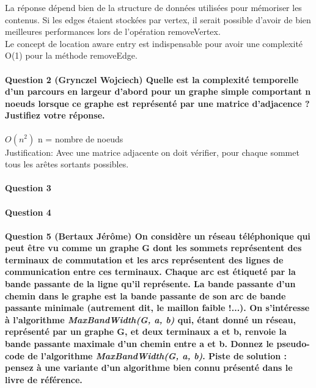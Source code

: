 \documentclass[a4paper]{article}
\begin{document}
La réponse dépend bien de la structure de données utilisées pour mémoriser les contenus. Si les edges étaient stockées par vertex, il serait possible d'avoir de bien meilleures performances lors de l'opération removeVertex.\\

Le concept de location aware entry est indispensable pour avoir une complexité O(1) pour la méthode removeEdge.

\paragraph{Question 2 (Grynczel Wojciech) Quelle est la complexité temporelle d’un parcours en largeur d’abord pour un	graphe simple comportant n noeuds lorsque ce graphe est représenté par une matrice d’adjacence ? Justifiez votre réponse.\\}

$ O(n^2) $ 	n = nombre de noeuds\\
Justification: Avec une matrice adjacente on doit vérifier, pour chaque sommet  tous les arêtes sortants possibles.


\paragraph{Question 3}

\paragraph{Question 4}

\paragraph{Question 5 (Bertaux Jérôme) On considère un réseau téléphonique qui peut être vu comme un graphe G dont les sommets représentent des terminaux de commutation et les arcs représentent des lignes de communication entre ces terminaux. Chaque arc est étiqueté par la bande passante de la ligne qu’il représente. La bande passante d’un chemin dans le graphe est la bande passante de son arc de bande passante minimale (autrement dit, le maillon faible !...). On s'intéresse à l’algorithme \textit{MaxBandWidth(G, a, b)} qui, étant donné un réseau, représenté par un graphe G, et deux terminaux a et b, renvoie la bande passante maximale d’un chemin entre a et b. Donnez le pseudo- code de l’algorithme \textit{MaxBandWidth(G, a, b)}. Piste de solution : pensez à une variante d’un algorithme bien connu présenté dans le livre de référence.}
\end{document}

